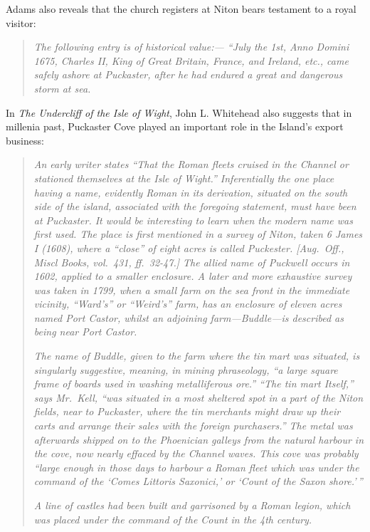 \documentclass[
  12pt,
  a5paper,
  twoside]{book}
\begin{document}
Adams also reveals that the church registers at Niton bears testament to
a royal visitor:

\begin{quote}
\emph{The following entry is of historical value:--- ``July the 1st,
Anno Domini 1675, Charles II, King of Great Britain, France, and
Ireland, etc., came safely ashore at Puckaster, after he had endured a
great and dangerous storm at sea.}
\end{quote}

In \emph{The Undercliff of the Isle of Wight}, John L. Whitehead also
suggests that in millenia past, Puckaster Cove played an important role
in the Island's export business:

\begin{quote}
\emph{An early writer states ``That the Roman fleets cruised in the
Channel or stationed themselves at the Isle of Wight.'' Inferentially
the one place having a name, evidently Roman in its derivation, situated
on the south side of the island, associated with the foregoing
statement, must have been at Puckaster. It would be interesting to learn
when the modern name was first used. The place is first mentioned in a
survey of Niton, taken 6 James I (1608), where a ``close'' of eight
acres is called Puckester. {[}Aug.~Off., Miscl Books, vol.~431,
ff.~32-47.{]} The allied name of Puckwell occurs in 1602, applied to a
smaller enclosure. A later and more exhaustive survey was taken in 1799,
when a small farm on the sea front in the immediate vicinity, ``Ward's''
or ``Weird's'' farm, has an enclosure of eleven acres named Port Castor,
whilst an adjoining farm---Buddle---is described as being near Port
Castor.}

\emph{The name of Buddle, given to the farm where the tin mart was
situated, is singularly suggestive, meaning, in mining phraseology, ``a
large square frame of boards used in washing metalliferous ore.'' ``The
tin mart Itself,'' says Mr.~Kell, ``was situated in a most sheltered
spot in a part of the Niton fields, near to Puckaster, where the tin
merchants might draw up their carts and arrange their sales with the
foreign purchasers.'' The metal was afterwards shipped on to the
Phoenician galleys from the natural harbour in the cove, now nearly
effaced by the Channel waves. This cove was probably ``large enough in
those days to harbour a Roman fleet which was under the command of the
`Comes Littoris Saxonici,' or `Count of the Saxon shore.'\,''}

\emph{A line of castles had been built and garrisoned by a Roman legion,
which was placed under the command of the Count in the 4th century.}


\end{quote}
\end{document}
